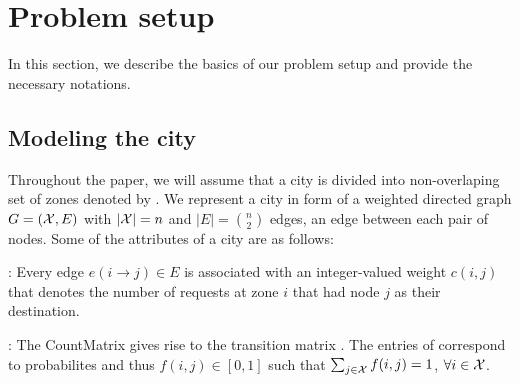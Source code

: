 
\section{Problem setup}
\label{sec:problem_setup}

In this section, we describe the basics of our problem setup and provide the necessary notations.

\iffalse
\subsection{Notation}
\label{sec:notation}

Vectors are denoted with lowercase bold letters (e.g., $\vec{a} = [a(i)]$) and matrices are denoted with uppercase bold letters (e.g., $\matr{A} = [a(i,j)]$). The notation $\vec{1}$ refers to the vector of ones, with size dependent on the context. The short form notation $\vec{A_i}$ refers to the $i$-th row vector of the matrix $\matr{A}$. Let $\Theta_n$ be a set of $n \times n$ right-stochastic transition matrices (non-negative matrices with rows that sum to one). A probability simplex in $\mathbb{R}^n$ is denoted by $\Delta_n = \{\vec{p} \in \mathbb{R}^n_+ : \transpose{p} \vec{1} = 1 \}$.
\fi

\subsection{Modeling the city}

Throughout the paper, we will assume that a city is divided into non-overlaping set of zones denoted by \cityzones. 
We represent a city in form of a weighted directed graph $G=(\mathcal{X}, E)$ with 
$|\mathcal{X}| = n$ and $|E| = {n \choose 2}$ edges, an edge between each pair of nodes. 
Some of the attributes of a city are as follows:


: 
Every edge $e(i\rightarrow j) \in E$ is associated with an
integer-valued weight $c(i,j)$ that denotes the number of requests
at zone $i$ that had node $j$ as their destination.

:
The {\sc CountMatrix} gives rise to the transition matrix {\empiricaltransitionmatrix}.
The entries of {\empiricaltransitionmatrix} correspond to probabilites and thus
$f(i,j) \in [0,1]$ such that
$\sum_{j \in \mathcal{X}} f(i,j) = 1$, $\forall i \in \mathcal{X}$.

